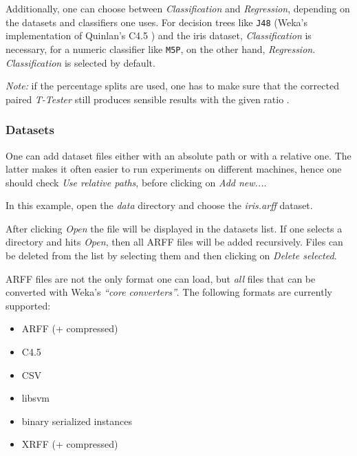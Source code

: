 Additionally, one can choose between \textit{Classification} and \textit{Regression}, depending on the datasets and classifiers one uses. For decision trees like \texttt{J48} (Weka's implementation of Quinlan's C4.5 \cite{quinlan}) and the iris dataset, \textit{Classification} is necessary, for a numeric classifier like \texttt{M5P}, on the other hand, \textit{Regression}. \textit{Classification} is selected by default.

\textit{Note:} if the percentage splits are used, one has to make sure that the corrected paired \textit{T-Tester} still produces sensible results with the given ratio \cite{bengio}.


\subsubsection{Datasets}

One can add dataset files either with an absolute path or with a relative one. The latter makes it often easier to run experiments on different machines, hence one should check \textit{Use relative paths}, before clicking on \textit{Add new...}.

\begin{center}
\end{center}


In this example, open the \textit{data} directory and choose the \textit{iris.arff} dataset.

\begin{center}
\end{center}


After clicking \textit{Open} the file will be displayed in the datasets list. If one selects a directory and hits \textit{Open}, then all ARFF files will be added recursively. Files can be deleted from the list by selecting them and then clicking on \textit{Delete selected}.

ARFF files are not the only format one can load, but \textit{all} files that can be converted with Weka's \textit{``core converters''}. The following formats are currently supported:

\begin{itemize}
	\item ARFF (+ compressed)
	\item C4.5
	\item CSV
	\item libsvm
	\item binary serialized instances
	\item XRFF (+ compressed)
\end{itemize}

